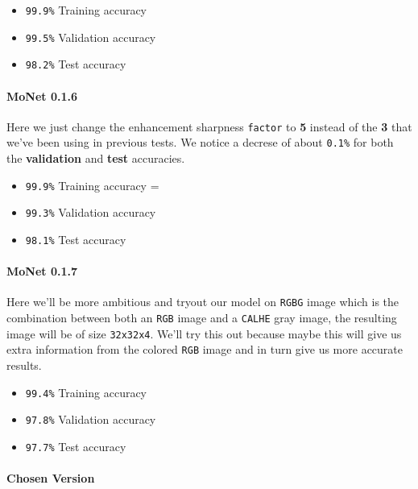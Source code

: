 \documentclass[11pt]{article}
\providecommand{\tightlist}{%
      \setlength{\itemsep}{0pt}\setlength{\parskip}{0pt}}
\begin{document}
\begin{itemize}
\tightlist
\item
  \texttt{99.9\%} Training accuracy
\item
  \texttt{99.5\%} Validation accuracy
\item
  \texttt{98.2\%} Test accuracy
\end{itemize}

\hypertarget{monet-0.1.6}{%
\paragraph{MoNet 0.1.6}\label{monet-0.1.6}}

Here we just change the enhancement sharpness \texttt{factor} to
\textbf{5} instead of the \textbf{3} that we've been using in previous
tests. We notice a decrese of about \texttt{0.1\%} for both the
\textbf{validation} and \textbf{test} accuracies.

\begin{itemize}
\tightlist
\item
  \texttt{99.9\%} Training accuracy =
\item
  \texttt{99.3\%} Validation accuracy
\item
  \texttt{98.1\%} Test accuracy
\end{itemize}

\hypertarget{monet-0.1.7}{%
\paragraph{MoNet 0.1.7}\label{monet-0.1.7}}

Here we'll be more ambitious and tryout our model on \texttt{RGBG} image
which is the combination between both an \texttt{RGB} image and a
\texttt{CALHE} gray image, the resulting image will be of size
\texttt{32x32x4}. We'll try this out because maybe this will give us
extra information from the colored \texttt{RGB} image and in turn give
us more accurate results.

\begin{itemize}
\tightlist
\item
  \texttt{99.4\%} Training accuracy\\
\item
  \texttt{97.8\%} Validation accuracy\\
\item
  \texttt{97.7\%} Test accuracy
\end{itemize}

\hypertarget{chosen-version}{%
\paragraph{Chosen Version}\label{chosen-version}}
\end{document}
